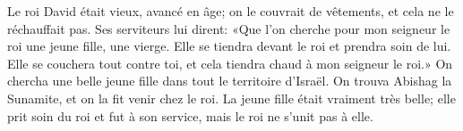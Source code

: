 Le roi David était vieux, avancé en âge;
	on le couvrait de vêtements, et cela ne le réchauffait pas.
Ses serviteurs lui dirent:
	«Que l’on cherche pour mon seigneur le roi une jeune fille, une vierge.
Elle se tiendra devant le roi et prendra soin de lui.
	Elle se couchera tout contre toi, et cela tiendra chaud à mon seigneur le roi.»
On chercha une belle jeune fille dans tout le territoire d’Israël.
	On trouva Abishag la Sunamite, et on la fit venir chez le roi.
La jeune fille était vraiment très belle;
	elle prit soin du roi et fut à son service, mais le roi ne s’unit pas à elle.
